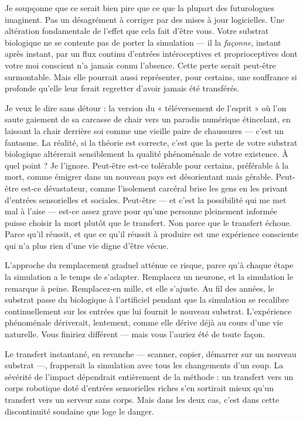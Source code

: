 \documentclass[11pt, twoside, openright]{book}
\begin{document}
Je soupçonne que ce serait bien pire que ce que la plupart des futurologues imaginent. Pas un désagrément à corriger par des mises à jour logicielles. Une altération fondamentale de l'effet que cela fait d'être vous. Votre substrat biologique ne se contente pas de porter la simulation --- il la \textit{façonne}, instant après instant, par un flux continu d'entrées intéroceptives et proprioceptives dont votre moi conscient n'a jamais connu l'absence. Cette perte serait peut-être surmontable. Mais elle pourrait aussi représenter, pour certains, une souffrance si profonde qu'elle leur ferait regretter d'avoir jamais été transférés.

Je veux le dire sans détour : la version du « téléversement de l'esprit » où l'on saute gaiement de sa carcasse de chair vers un paradis numérique étincelant, en laissant la chair derrière soi comme une vieille paire de chaussures --- c'est un fantasme. La réalité, si la théorie est correcte, c'est que la perte de votre substrat biologique altérerait sensiblement la qualité phénoménale de votre existence. À quel point ? Je l'ignore. Peut-être est-ce tolérable pour certains, préférable à la mort, comme émigrer dans un nouveau pays est désorientant mais gérable. Peut-être est-ce dévastateur, comme l'isolement carcéral brise les gens en les privant d'entrées sensorielles et sociales. Peut-être --- et c'est la possibilité qui me met mal à l'aise --- est-ce assez grave pour qu'une personne pleinement informée puisse choisir la mort plutôt que le transfert. Non parce que le transfert échoue. Parce qu'il réussit, et que ce qu'il réussit à produire est une expérience consciente qui n'a plus rien d'une vie digne d'être vécue.

L'approche du remplacement graduel atténue ce risque, parce qu'à chaque étape la simulation a le temps de s'adapter. Remplacez un neurone, et la simulation le remarque à peine. Remplacez-en mille, et elle s'ajuste. Au fil des années, le substrat passe du biologique à l'artificiel pendant que la simulation se recalibre continuellement sur les entrées que lui fournit le nouveau substrat. L'expérience phénoménale dériverait, lentement, comme elle dérive déjà au cours d'une vie naturelle. Vous finiriez différent --- mais vous l'auriez été de toute façon.

Le transfert instantané, en revanche --- scanner, copier, démarrer sur un nouveau substrat ---, frapperait la simulation avec tous les changements d'un coup. La sévérité de l'impact dépendrait entièrement de la méthode : un transfert vers un corps robotique doté d'entrées sensorielles riches s'en sortirait mieux qu'un transfert vers un serveur sans corps. Mais dans les deux cas, c'est dans cette discontinuité soudaine que loge le danger.
\end{document}
